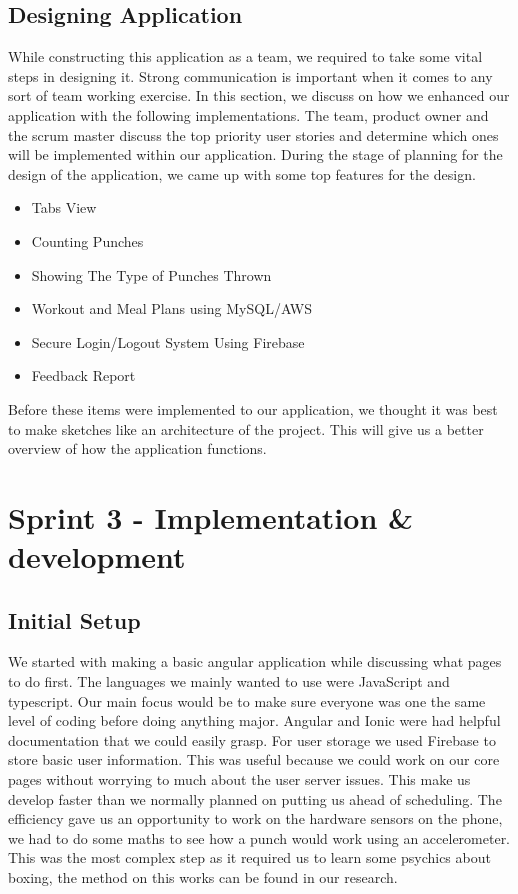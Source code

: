 \documentclass[a4paper,12pt]{report}
\begin{document}
\subsection{Designing Application}
While constructing this application as a team, we required to take some vital steps in designing it. Strong communication is important when it comes to any sort of team working exercise. In this section, we discuss on how we enhanced our application with the following implementations.
\newline
The team, product owner and the scrum master discuss the top priority user stories and determine which ones will be implemented within our application. During the stage of planning for the design of the application, we came up with some top features for the design.

\begin{itemize}
  \item Tabs View
  \item Counting Punches
  \item Showing The Type of Punches Thrown
  \item Workout and Meal Plans using MySQL/AWS
  \item Secure Login/Logout System Using Firebase
  \item Feedback Report
  \newline
\end{itemize}

Before these items were implemented to our application, we thought it was best to make sketches like an architecture of the project. This will give us a better overview of how the application functions.

\newpage
\section{Sprint 3 - Implementation \& development}
\subsection{Initial Setup}
We started with making a basic angular application while discussing what pages to do first. The languages we mainly wanted to use were JavaScript and typescript. Our main focus would be to make sure everyone was one the same level of coding before doing anything major. Angular and Ionic were had helpful documentation that we could easily grasp. For user storage we used Firebase to store basic user information. This was useful because we could work on our core pages without worrying to much about the user server issues. This make us develop faster than we normally planned on putting us ahead of scheduling. The efficiency gave us an opportunity to work on the hardware sensors on the phone, we had to do some maths to see how a punch would work using an accelerometer. This was the most complex step as it required us to learn some psychics about boxing, the method on this works can be found in our research. 
\end{document}
